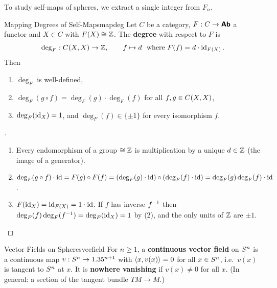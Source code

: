 To study self-maps of spheres, we extract a single integer from $F_n$.

\begin{proposition}{Mapping Degrees of Self-Maps}{mapdeg}
  Let $C$ be a category, $F:C\to\bm{\mathsf{Ab}}$ a functor and $X\in C$ with $F(X)\cong\mathbb{Z}$. The \textbf{degree} with respect to $F$ is \[
    \deg_F:C(X,X)\to\mathbb{Z},\qquad f\mapsto d\ \text{ where }F(f)=d\cdot\operatorname{id}_{F(X)}.
  \]
  Then
  \begin{enumerate}
    \item $\deg_F$ is well-defined,
    \item $\deg_F(g\circ f)=\deg_F(g)\cdot\deg_F(f)$ for all $f,g\in C(X,X)$,
    \item $\deg_F(\operatorname{id}_X)=1$, and $\deg_F(f)\in\{\pm1\}$ for every isomorphism $f$.
  \end{enumerate}
\end{proposition}
\begin{proof}[]
  \begin{enumerate}
    \item Every endomorphism of a group $\cong\mathbb{Z}$ is multiplication by a unique $d\in\mathbb{Z}$ (the image of a generator).
    \item $\deg_F(g\circ f)\cdot\operatorname{id}=F(g)\circ F(f)=(\deg_F(g)\cdot\operatorname{id})\circ(\deg_F(f)\cdot\operatorname{id})=\deg_F(g)\deg_F(f)\cdot\operatorname{id}$.
    \item $F(\operatorname{id}_X)=\operatorname{id}_{F(X)}=1\cdot\operatorname{id}$. If $f$ has inverse $f^{-1}$ then $\deg_F(f)\deg_F(f^{-1})=\deg_F(\operatorname{id}_X)=1$ by (2), and the only units of $\mathbb{Z}$ are $\pm1$.
  \end{enumerate}
\end{proof}

\begin{remark}{Vector Fields on Spheres}{vecfield}
  For $n\geq1$, a \textbf{continuous vector field} on $S^{n}$ is a continuous map $v:S^{n}\to1.35^{n+1}$ with $\langle x,v(x)\rangle=0$ for all $x\in S^{n}$, i.e.\ $v(x)$ is tangent to $S^{n}$ at $x$. It is \textbf{nowhere vanishing} if $v(x)\neq0$ for all $x$. (In general: a section of the tangent bundle $TM\to M$.)
\end{remark}

